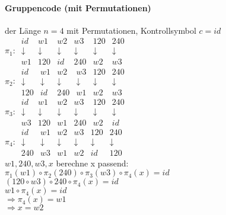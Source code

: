\paragraph{Gruppencode (mit Permutationen)}der Länge $n=4$ mit Permutationen, Kontrollsymbol $c=id$\\
$\pi_1$: 
$\begin{array}{cccccc}
id & w1 & w2 & w3 & 120 & 240 \\ 
\downarrow & \downarrow & \downarrow & \downarrow & \downarrow & \downarrow \\ 
w1 & 120 & id & 240 & w2 & w3
\end{array}$ 
\\
$\pi_2$: 
$\begin{array}{cccccc}
id & w1 & w2 & w3 & 120 & 240 \\ 
\downarrow & \downarrow & \downarrow & \downarrow & \downarrow & \downarrow \\ 
120 & id & 240 & w1 & w2 & w3
\end{array}$ 
\\
$\pi_3$: 
$\begin{array}{cccccc}
id & w1 & w2 & w3 & 120 & 240 \\ 
\downarrow & \downarrow & \downarrow & \downarrow & \downarrow & \downarrow \\ 
w3 & 120 & w1 & 240 & w2 & id
\end{array}$ 
\\
$\pi_4$: 
$\begin{array}{cccccc}
id & w1 & w2 & w3 & 120 & 240 \\ 
\downarrow & \downarrow & \downarrow & \downarrow & \downarrow & \downarrow \\ 
240 & w3 & w1 & w2 & id & 120
\end{array}$ 
\\
$w1,240,w3,x$ berechne x passend:\\ 
$\pi_1(w1) \circ \pi_2(240) \circ \pi_3(w3) \circ \pi_4(x) = id$\\
$(120 \circ w3) \circ 240 \circ \pi_4(x) = id$\\
$w1 \circ \pi_4(x) = id$\\
$\Rightarrow \pi_4(x) = w1$\\
$\Rightarrow x=w2$\\

